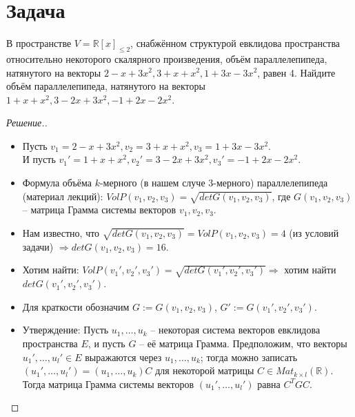 \documentclass[a4paper]{article}
\theoremstyle{remark}
\begin{document}
    \section*{Задача }
        В пространстве $V = \mathbb{R}[x]_{\leqslant 2}$, снабжённом структурой евклидова пространства
        относительно некоторого скалярного произведения, объём параллелепипеда, натянутого на векторы
        $2 - x + 3x^2, 3 + x + x^2, 1 + 3x - 3x^2$, равен 4. Найдите объём параллелепипеда, натянутого
        на векторы $1 + x + x^2, 3 - 2x + 3x^2, -1 + 2x - 2x^2$. 
         \begin{proof}[Решение.] \ 
          \begin{itemize}
              \item Пусть $v_1 = 2 - x + 3x^2, v_2 = 3 + x + x^2, v_3 = 1 + 3x - 3x^2$. \\
              И пусть $v_1' = 1 + x + x^2, v_2' = 3 - 2x + 3x^2, v_3' = -1 + 2x - 2x^2$.
              \item Формула объёма $k$-мерного (в нашем случе 3-мерного) параллелепипеда (материал
              лекций): $VolP(v_1, v_2, v_3) = \sqrt{detG(v_1, v_2, v_3)}$, где $G(v_1, v_2, v_3)$ --
              матрица Грамма системы векторов $v_1, v_2, v_3$.
              \item Нам известно, что $\sqrt{detG(v_1, v_2, v_3)} = VolP(v_1, v_2, v_3) = 4$ (из
              условий задачи) $\Rightarrow detG(v_1, v_2, v_3) = 16$. 
              \item Хотим найти: $VolP(v_1', v_2', v_3') = \sqrt{detG(v_1', v_2', v_3')} \Rightarrow$
              хотим найти $detG(v_1', v_2', v_3')$.
              \item Для краткости обозначим $G := G(v_1, v_2, v_3)$, $G' := G(v_1', v_2', v_3')$.
              \item Утверждение: Пусть $u_1, \ldots, u_k$ -- некоторая система векторов 
              евклидова пространства $E$, и пусть $G$ -- её матрица Грамма. Предположим, что
              векторы $u_1', \ldots, u_l' \in E$ выражаются через $u_1, \ldots, u_k$; тогда
              можно записать $(u_1', \ldots, u_l') = (u_1, \ldots, u_k)C$ для некоторой матрицы
              $C \in Mat_{k \times l}(\mathbb{R})$. Тогда матрица Грамма системы векторов
              $(u_1', \ldots, u_l')$ равна $C^TGC$. \\
              

\end{itemize}
\end{proof}
\end{document}

